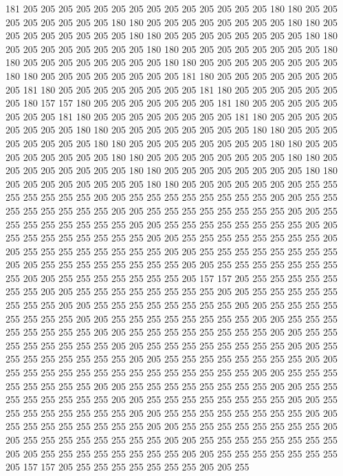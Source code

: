 181 205 205 205 205 205 205 205 205 205 205 205 205 205 205 180 180 205 205 205
205 205 205 205 205 180 180 205 205 205 205 205 205 205 205 180 180 205 205 205
205 205 205 205 205 180 180 205 205 205 205 205 205 205 205 180 180 205 205 205
205 205 205 205 205 180 180 205 205 205 205 205 205 205 205 180 180 205 205 205
205 205 205 205 205 180 180 205 205 205 205 205 205 205 205 180 180 205 205 205
205 205 205 205 205 181 180 205 205 205 205 205 205 205 205 181 180 205 205 205
205 205 205 205 205 181 180 205 205 205 205 205 205 205 180 157 157 180 205 205
205 205 205 205 205 181 180 205 205 205 205 205 205 205 205 181 180 205 205 205
205 205 205 205 205 181 180 205 205 205 205 205 205 205 205 180 180 205 205 205
205 205 205 205 205 180 180 205 205 205 205 205 205 205 205 180 180 205 205 205
205 205 205 205 205 180 180 205 205 205 205 205 205 205 205 180 180 205 205 205
205 205 205 205 205 180 180 205 205 205 205 205 205 205 205 180 180 205 205 205
205 205 205 205 205 180 180 205 205 205 205 205 205 205 205 180 180 205 205 205
205 205 205 205 255 255 255 255 255 255 255 205 205 255 255 255 255 255 255 255
255 205 205 255 255 255 255 255 255 255 255 205 205 255 255 255 255 255 255 255
255 205 205 255 255 255 255 255 255 255 255 205 205 255 255 255 255 255 255 255
255 205 205 255 255 255 255 255 255 255 255 205 205 255 255 255 255 255 255 255
255 205 205 255 255 255 255 255 255 255 255 205 205 255 255 255 255 255 255 255
255 205 205 255 255 255 255 255 255 255 255 205 205 255 255 255 255 255 255 255
255 205 205 255 255 255 255 255 255 255 205 157 157 205 255 255 255 255 255 255
255 205 205 255 255 255 255 255 255 255 255 205 205 255 255 255 255 255 255 255
255 205 205 255 255 255 255 255 255 255 255 205 205 255 255 255 255 255 255 255
255 205 205 255 255 255 255 255 255 255 255 205 205 255 255 255 255 255 255 255
255 205 205 255 255 255 255 255 255 255 255 205 205 255 255 255 255 255 255 255
255 205 205 255 255 255 255 255 255 255 255 205 205 255 255 255 255 255 255 255
255 205 205 255 255 255 255 255 255 255 255 205 205 255 255 255 255 255 255 255
255 255 255 255 255 255 255 205 205 255 255 255 255 255 255 255 255 205 205 255
255 255 255 255 255 255 255 205 205 255 255 255 255 255 255 255 255 205 205 255
255 255 255 255 255 255 255 205 205 255 255 255 255 255 255 255 255 205 205 255
255 255 255 255 255 255 255 205 205 255 255 255 255 255 255 255 255 205 205 255
255 255 255 255 255 255 255 205 205 255 255 255 255 255 255 255 255 205 205 255
255 255 255 255 255 255 255 205 205 255 255 255 255 255 255 255 255 205 205 255
255 255 255 255 255 255 205 157 157 205 255 255 255 255 255 255 255 205 205 255
